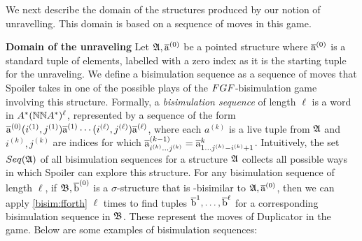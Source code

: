 \noindent
We next describe the domain of the structures produced by our notion of unravelling.
This domain is based on a sequence of moves in this game.

\noindent \textbf{Domain of the unraveling}
Let ${\mathfrak{A}}, \overline{\mathrm{a}}^{(0)}$ be a pointed structure where $\overline{\mathrm{a}}^{(0)}$ is a standard tuple of elements, labelled with a zero index as it is the starting tuple for the unraveling.
We define a bisimulation sequence as a sequence of moves that Spoiler takes in one of the possible plays of the $\FGF$-bisimulation game involving this structure.
Formally, a \emph{bisimulation sequence} of length $\ell$ is a word in $A^*({\mathbb{N}}{\mathbb{N}}{}A^{*})^{\ell}$, represented by a sequence of the form $\overline{\mathrm{a}}^{(0)}(i^{(1)}, j^{(1)})\overline{\mathrm{a}}^{(1)}\cdots(i^{(\ell)}, j^{(\ell)})\overline{\mathrm{a}}^{(\ell)}$, where each $a^{(k)}$ is a live tuple from ${\mathfrak{A}}$ and $i^{(k)}, j^{(k)}$ are indices for which $\overline{\mathrm{a}}_{i^{(k)}\ldots j^{(k)}}^{(k-1)} = \overline{\mathrm{a}}_{1\ldots j^{(k)}-i^{(k)}+1}^{k}$.
Intuitively, the set $\Seq{A}$ of all bisimulation sequences for a structure ${\mathfrak{A}}$ collects all possible ways in which Spoiler can explore this structure.
For any bisimulation sequence of length $\ell$, if ${\mathfrak{B}}, \overline{\mathrm{b}}^{(0)}$ is a $\sigma$-structure that is \FGF-bisimilar to ${\mathfrak{A}}, \overline{\mathrm{a}}^{(0)}$, then we can apply \ref{bisim:fforth} $\ell$ times to find tuples $\overline{\mathrm{b}}^{1}, \ldots, \overline{\mathrm{b}}^{\ell}$ for a corresponding bisimulation sequence in ${\mathfrak{B}}$.
These represent the moves of Duplicator in the game.
Below are some examples of bisimulation sequences:
